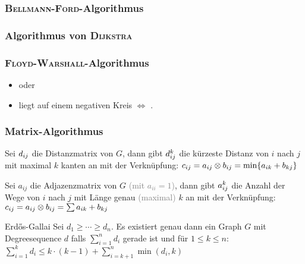 \subsubsection{\textsc{Bellmann-Ford}-Algorithmus}

\subsubsection{Algorithmus von \textsc{Dijkstra}}

\subsubsection{\textsc{Floyd-Warshall}-Algorithmus}
\begin{itemize}
	\item {} oder 
	\item {} liegt auf einem negativen Kreis $\Leftrightarrow$ .
\end{itemize}

\subsubsection{Matrix-Algorithmus}
Sei $d_{i\smash{j}}$ die Distanzmatrix von $G$, dann gibt $d_{i\smash{j}}^k$ die kürzeste Distanz von $i$ nach $j$ mit maximal $k$ kanten an mit der Verknüpfung: $c_{i\smash{j}} = a_{i\smash{j}} \otimes b_{i\smash{j}} = \min\{a_{ik} + b_{k\smash{j}}\}$


Sei $a_{ij}$ die Adjazenzmatrix von $G$ \textcolor{gray}{(mit $a_{ii} = 1$)}, dann gibt $a_{i\smash{j}}^k$ die Anzahl der Wege von $i$ nach $j$ mit Länge genau \textcolor{gray}{(maximal)} $k$ an mit der Verknüpfung: $c_{i\smash{j}} = a_{i\smash{j}} \otimes b_{i\smash{j}} = \sum a_{ik} + b_{k\smash{j}}$


\begin{algorithm}{Erd\H{o}s-Gallai}
	Sei $d_1 \geq \cdots \geq d_{n}$. Es existiert genau dann ein Graph $G$ mit Degreesequence $d$ falls $\sum\limits_{i=1}^{n} d_i$ gerade ist und für $1\leq k \leq n$: $\sum\limits_{i=1}^{k} d_i \leq k\cdot(k-1)+\sum\limits_{i=k+1}^{n} \min(d_i, k)$
	\begin{methods}
	\end{methods}
\end{algorithm}

